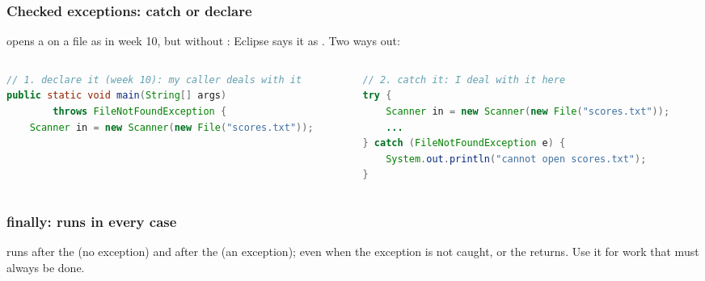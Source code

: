 \documentclass[aspectratio=169,10pt,compress]{beamer}
\begin{document}
\begin{frame}[t,fragile] \frametitle{Checked exceptions: catch or declare}
	\footnotesize {} opens a  on a file as in week 10, but without :
	\footnotesize Eclipse says it as . Two ways out:

	\begin{columns}[T]
		\begin{column}{0.49\textwidth}


\begin{lstlisting}[style=codesnippet, language=Java, basicstyle=\ttfamily\fontsize{6.4}{7.6}\selectfont]
// 1. declare it (week 10): my caller deals with it
public static void main(String[] args)
        throws FileNotFoundException {
    Scanner in = new Scanner(new File("scores.txt"));
\end{lstlisting}


		\end{column}
		\begin{column}{0.49\textwidth}


\begin{lstlisting}[style=codesnippet, language=Java, basicstyle=\ttfamily\fontsize{6.4}{7.6}\selectfont]
// 2. catch it: I deal with it here
try {
    Scanner in = new Scanner(new File("scores.txt"));
    ...
} catch (FileNotFoundException e) {
    System.out.println("cannot open scores.txt");
}
\end{lstlisting}


		\end{column}
	\end{columns}
\end{frame}




\begin{frame}[t,fragile] \frametitle{finally: runs in every case}

	\footnotesize {} runs after the  (no exception) and after the  (an exception);
	even when the exception is not caught, or the  returns. Use it for work that must always be done.
\end{frame}
\end{document}
